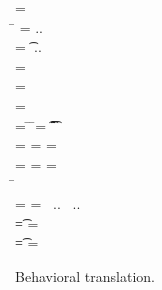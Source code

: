 \documentclass[runnningheads]{tex/llncs}
\begin{document}
\begin{figure}[!b]
	
	\hrulefill
	
	\medskip
	
	\small
	\begin{minipage}{12cm}  
		\begin{tabbing}
			 =  \\
			\hspace{4.6cm}\= \WHERE\HS 
			\mdp[1] = \src{\Mdef\m\x\t\tp{\ep[1]}} ..\HS\HS \\
			\>\qquad\HS\HS\HS\HS\md[1] = \Mdef\m\x\t\tp{\e[1]} ..\HS\HS \\
			\>\qquad\HS\HS\HS\HS \ep[1] = \TRG{\e[1]}{\x:\t\,\this:\C}
			\\
			\TRG\x\Env = \src{\x}
			\\
			\TRG{\FRead\f}\Env  = \src{\FRead\f}
			\\
			\TRG{\FWrite\f\e}\Env =  \src{\FWrite\f\ep} 
			\>\WHERE\HS
			\= \TypeCk\K{\this}\C \HS\HS
			\=  \ep = \TAG\e\Env\t \HS\HS
			\= \Ftype\f\t\In\App\K\C
			\\
			\TRG{\Call{\e[1]}\m{\e[2]}}\Env = \src{\DynCall{\ep[1]}\m{\ep[2]}}
			\>\WHERE \> \TypeCk{\K,\Env}{\e[1]}\any \HS
			\> \ep[1] = \TRG{\e[1]}\Env \HS
			\> \ep[2] = \TAG{\e[2]}\Env\any
			\\
			\TRG{\Call{\e[1]}\m{\e[2]}}\Env = \src{\KCall{\ep[1]}\m{\ep[2]}{\D[1]}{\D[2]}}
			\>\WHERE \> \TypeCk{\K,\Env}{\e[1]}\C 
			\> \ep[1] = \TRG{\e[1]}\Env\HS\HS
			\> \ep[2] = \TAG{\e[2]}\Env{\D[1]} \HS\HS \\
			\> \> \=  \Mtype\m{\D[1]}{\D[2]}\In\App\K\C 
			\\
			\Env =  
			\>\WHERE \>  \ep[1] = \TAG{\e[1]}\Env{\t[1]} ~..
			\> \HS\HS\HS\HS\HS\HS\HS\HS\HS\HS \Ftype{\f[1]}{\t[1]}\In\App\K\C ~..
			\\
			\TAG\e\Env\t = \src\ep
			\> \WHERE\> \TypeCk{\K,\Env}\e\tp \HS
			\>\HS\HS\HS\HS\HS\HS\HS\HS\HS\HS \EM{\K\vdash \t \Sub \tp}
			\>\ep = \TRG\e\Env
			\\
			\TAG\e\Env\t = \src{\BehCast\t\e}
			\>\WHERE\> \TypeCk{\K,\Env}\e\tp \HS 
			\>\HS\HS\HS\HS\HS\HS\HS\HS\HS\HS  \EM{\K\vdash \t \not \Sub \tp}
			\> \ep = \TRG\e\Env
		\end{tabbing}
	\end{minipage}
	
	\medskip
	
	\hrulefill
	\caption{Behavioral translation.}\label{trtr2}
\end{figure}
\end{document}
